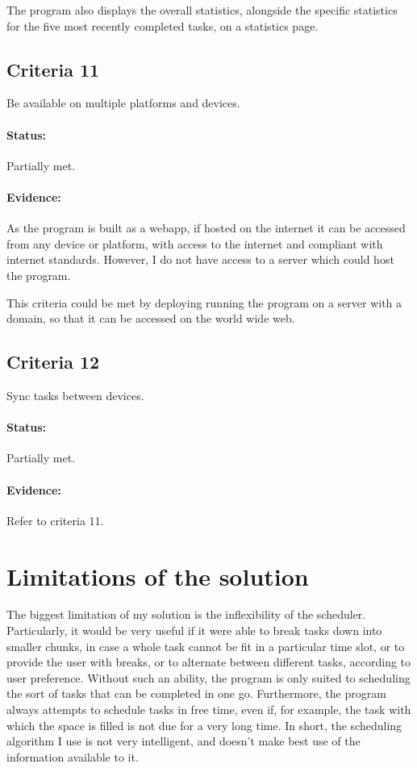 \documentclass{article}
\begin{document}
The program also displays the overall statistics,
alongside the specific statistics for the five most recently completed tasks,
on a statistics page.

\subsection{Criteria 11}
Be available on multiple platforms and devices.

\paragraph{Status:}
Partially met.

\paragraph{Evidence:}
As the program is built as a webapp,
if hosted on the internet it can be accessed from any device or platform,
with access to the internet and compliant with internet standards.
However, I do not have access to a server which could host the program.

This criteria could be met by deploying running the program on a server with a domain,
so that it can be accessed on the world wide web.

\subsection{Criteria 12}
Sync tasks between devices.

\paragraph{Status:}
Partially met.

\paragraph{Evidence:}
Refer to criteria 11.

\section{Limitations of the solution}
The biggest limitation of my solution is the inflexibility of the scheduler.
Particularly,
it would be very useful if it were able to break tasks down into smaller chunks,
in case a whole task cannot be fit in a particular time slot,
or to provide the user with breaks,
or to alternate between different tasks,
according to user preference.
Without such an ability,
the program is only suited to scheduling the sort of tasks that can be completed in one go.
Furthermore,
the program always attempts to schedule tasks in free time,
even if, for example,
the task with which the space is filled is not due for a very long time.
In short,
the scheduling algorithm I use is not very intelligent,
and doesn't make best use of the information available to it.
\end{document}
